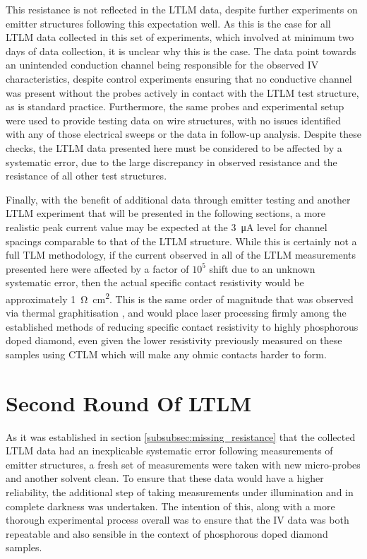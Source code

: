 \begin{refsection}
This resistance is not reflected in the LTLM data, despite further experiments on emitter structures following this expectation well. As this is the case for all LTLM data collected in this set of experiments, which involved at minimum two days of data collection, it is unclear why this is the case. The data point towards an unintended conduction channel being responsible for the observed IV characteristics, despite control experiments ensuring that no conductive channel was present without the probes actively in contact with the LTLM test structure, as is standard practice. Furthermore, the same probes and experimental setup were used to provide testing data on wire structures, with no issues identified with any of those electrical sweeps or the data in follow-up analysis. Despite these checks, the LTLM data presented here must be considered to be affected by a systematic error, due to the large discrepancy in observed resistance and the resistance of all other test structures.

Finally, with the benefit of additional data through emitter testing and another LTLM experiment that will be presented in the following sections, a more realistic peak current value may be expected at the 3~\si{\micro\ampere} level for channel spacings comparable to that of the LTLM structure. While this is certainly not a full TLM methodology, if the current observed in all of the LTLM measurements presented here were affected by a factor of $10^{5}$ shift due to an unknown systematic error, then the actual specific contact resistivity would be approximately 1~\si{\ohm\centi\metre\squared}. This is the same order of magnitude that was observed via thermal graphitisation \cite{matsumoto2013}, and would place laser processing firmly among the established methods of reducing specific contact resistivity to highly phosphorous doped diamond, even given the lower resistivity previously measured on these samples using CTLM which will make any ohmic contacts harder to form. 

\section{Second Round Of LTLM}
\label{subsec:ltlm2_lost_data}
As it was established in section \ref{subsubsec:missing_resistance} that the collected LTLM data had an inexplicable systematic error following measurements of emitter structures, a fresh set of measurements were taken with new micro-probes and another solvent clean. To ensure that these data would have a higher reliability, the additional step of taking measurements under illumination and in complete darkness was undertaken. The intention of this, along with a more thorough experimental process overall was to ensure that the IV data was both repeatable and also sensible in the context of phosphorous doped diamond samples.


\end{refsection}
